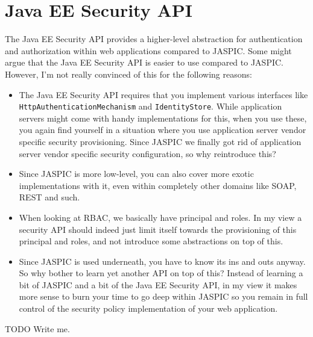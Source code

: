 \section{Java EE Security API}
The Java EE Security API \cite{security-api} provides a higher-level abstraction for authentication and authorization within web applications compared to JASPIC.
Some might argue that the Java EE Security API is easier to use compared to JASPIC.
However, I'm not really convinced of this for the following reasons:
\begin{itemize}
\item The Java EE Security API requires that you implement various interfaces like \texttt{HttpAuthenticationMechanism} and \texttt{IdentityStore}.
While application servers might come with handy implementations for this,
when you use these, you again find yourself in a situation where you use application server vendor specific security provisioning.
Since JASPIC we finally got rid of application server vendor specific security configuration, so why reintroduce this?
\item Since JASPIC is more low-level, you can also cover more exotic implementations with it, even within completely other domains like SOAP, REST and such.
\item When looking at RBAC, we basically have principal and roles.
In my view a security API should indeed just limit itself towards the provisioning of this principal and roles, and not introduce some abstractions on top of this.
\item Since JASPIC is used underneath, you have to know its ins and outs anyway.
So why bother to learn yet another API on top of this?
Instead of learning a bit of JASPIC and a bit of the Java EE Security API,
in my view it makes more sense to burn your time to go deep within JASPIC so you remain in full control of the security policy implementation of your web application.
\end{itemize}

\begin{TODO}{TODO}
	Write me.
\end{TODO}